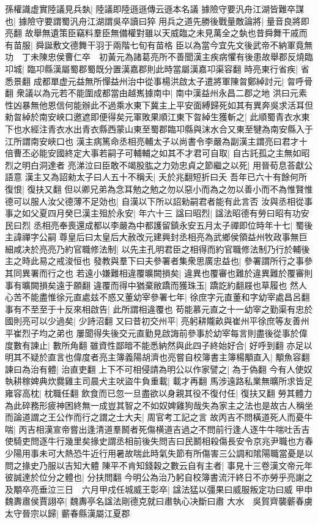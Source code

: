 孫權識虚實陸議見兵埶|{
	陸議即陸遜遜傳云遜本名議}
據險守要汎舟江湖皆難卒謀也|{
	據險守要謂蜀汎舟江湖謂吳卒讀曰猝}
用兵之道先勝後戰量敵論將|{
	量音良將即亮翻}
故舉無遺策臣竊料羣臣無備權對雖以天威臨之未見萬全之埶也昔舜舞干戚而有苗服|{
	舜誕敷文德舞干羽于兩階七旬有苗格}
臣以為當今宜先文後武帝不納軍竟無功　丁未陳忠侯曹仁卒　初黃元為諸葛亮所不善聞漢主疾病懼有後患故舉郡反燒臨卭城|{
	臨卭縣漢屬蜀郡蜀既分置漢嘉郡則此時當屬漢嘉卭渠容翻}
時亮東行省疾|{
	省悉景翻}
成都單虚元益無所憚益州治中從事楊洪啟太子遣將軍陳曶鄭綽討元|{
	曶呼骨翻}
衆議以為元若不能圍成都當由越嶲據南中|{
	南中漢益州永昌二郡之地}
洪曰元素性凶暴無他恩信何能辦此不過乘水東下冀主上平安面縛歸死如其有異奔吳求活耳但勑曶綽於南安峽口邀遮即便得矣元軍敗果順江東下曶綽生獲斬之|{
	此順蜀青衣水東下也水經注青衣水出青衣縣西蒙山東至蜀郡臨卭縣與沫水合又東至犍為南安縣入于江所謂南安峽口也}
漢主病篤命丞相亮輔太子以尚書令李嚴為副漢主謂亮曰君才十倍曹丕必能安國終定大事若嗣子可輔輔之如其不才君可自取|{
	自古託孤之主無如昭烈之明白洞達者}
亮涕泣曰臣敢不竭股肱之力効忠貞之節繼之以死|{
	用晉荀息荅獻公語意}
漢主又為詔勑太子曰人五十不稱夭|{
	夭於兆翻短折曰夭}
吾年已六十有餘何所復恨|{
	復扶又翻}
但以卿兄弟為念耳勉之勉之勿以惡小而為之勿以善小而不為惟賢惟德可以服人汝父德薄不足効也|{
	自漢以下所以詔勑嗣君者能有此言否}
汝與丞相從事事之如父夏四月癸巳漢主殂於永安|{
	年六十三}
諡曰昭烈|{
	諡法昭德有勞曰昭有功安民曰烈}
丞相亮奉喪還成都以李嚴為中都護留鎮永安五月太子禪即位時年十七|{
	蜀後主諱禪字公嗣}
尊皇后曰太皇后大赦改元建興封丞相亮為武鄉侯領益州牧政事無巨細咸决於亮亮乃約官職修法制|{
	以先主孔明君臣之相得而約官職修法制乃行於輔後主之時此易之戒浚恒也}
發教與羣下曰夫參署者集衆思廣忠益也|{
	參署謂所行之事參其同異署而行之也}
若遠小嫌難相違覆曠闕損矣|{
	違異也覆審也難於違異難於覆審則事有曠闕損矣遠于願翻}
違覆而得中猶棄敝蹻而獲珠玉|{
	蹻訖約翻屐也草履也}
然人心苦不能盡惟徐元直處兹不惑又董幼宰參署七年|{
	徐庶字元直董和字幼宰處昌呂翻}
事有不至至于十反來相啟告|{
	此所謂相違覆也}
苟能慕元直之十一幼宰之勤渠有忠於國則亮可以少過矣|{
	少詩沼翻}
又曰昔初交州平|{
	亮躬耕隴畝與崔州平徐庶等友善州平崔烈子均之弟也}
屢聞得失後交元直勤見啟誨前參事於幼宰每言則盡後從事於偉度數有諫止|{
	數所角翻}
雖資性鄙暗不能悉納然與此四子終始好合|{
	好呼到翻}
亦足以明其不疑於直言也偉度者亮主簿義陽胡濟也亮嘗自校簿書主簿楊顒直入|{
	顒魚容翻}
諫曰為治有體|{
	治直吏翻}
上下不可相侵請為明公以作家譬之|{
	為于偽翻}
今有人使奴執耕稼婢典炊爨雞主司晨犬主吠盜牛負重載|{
	載才再翻}
馬涉遠路私業無曠所求皆足雍容高枕|{
	枕職任翻}
飲食而已忽一旦盡欲以身親其役不復付任|{
	復扶又翻}
勞其體力為此碎務形疲神困終無一成豈其智之不如奴婢雞狗哉失為家主之法也是故古人稱坐而論道謂之王公作而行之謂之士大夫|{
	周官考工記之言}
故丙吉不問橫道死人而憂牛喘|{
	丙吉相漢宣帝嘗出逢清道羣鬭者死傷横道吉過之不問前行逢人逐牛牛喘吐舌吉使騎吏問逐牛行幾里矣掾史謂丞相前後失問吉曰民鬭相殺傷長安令京兆尹職也方春少陽用事未可大熱恐牛近行用暑故喘此時氣失節有所傷害三公調和隂陽職當憂是以問之掾史乃服以吉知大體}
陳平不肯知錢穀之數云自有主者|{
	事見十三卷漢文帝元年}
彼誠達於位分之體也|{
	分扶問翻}
今明公為治乃躬自校簿書流汗終日不亦勞乎亮謝之及顒卒亮垂泣三日　六月甲戍任城威王彰卒|{
	諡法猛以彊果曰威服叛定功曰威}
甲申魏夀肅侯賈詡卒|{
	魏夀亭名諡法剛德克就曰肅執心决斷曰肅}
大水　吳賀齊襲蘄春虜太守晉宗以歸|{
	蘄春縣漢屬江夏郡}


